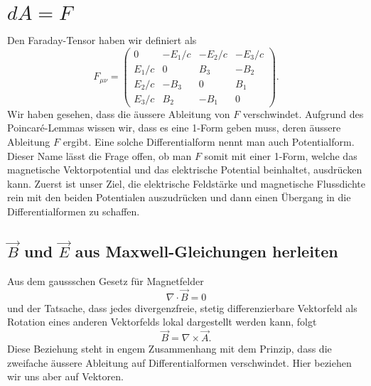 \section{$dA = F$
	\label{maxwell:section:dA}}
Den Faraday-Tensor haben wir definiert als
\begin{equation}
	F_{\mu\nu} = \begin{pmatrix}
		0 & -E_1/c & -E_2/c & -E_3/c \\ E_1/c & 0 & B_3 & -B_2 \\ E_2/c & -B_3 & 0 & B_1 \\ E_3/c & B_2 & -B_1 & 0 
	\end{pmatrix}.
	\label{maxwell:section:dA:Faraday-Tensor}
\end{equation}
Wir haben gesehen, dass die äussere Ableitung von $F$ verschwindet.
Aufgrund des Poincaré-Lemmas wissen wir, dass es eine 1-Form geben muss, deren äussere Ableitung $F$ ergibt.
Eine solche Differentialform nennt man auch Potentialform.
Dieser Name lässt die Frage offen, ob man $F$ somit mit einer 1-Form, welche das magnetische Vektorpotential und das elektrische Potential beinhaltet, ausdrücken kann.
Zuerst ist unser Ziel, die elektrische Feldstärke und magnetische Flussdichte rein mit den beiden Potentialen auszudrücken und dann einen Übergang in die Differentialformen zu schaffen. 

\subsection{$\vec{B}$ und $\vec{E}$ aus Maxwell-Gleichungen herleiten}
Aus dem gaussschen Gesetz für Magnetfelder
\begin{equation*}
	\nabla \cdot \vec{B} = 0
\end{equation*}
und der Tatsache, dass jedes divergenzfreie, stetig differenzierbare Vektorfeld als Rotation eines anderen Vektorfelds lokal dargestellt werden kann,
folgt
\begin{equation}
	\label{maxwell:dA;rotA}
	\vec{B} = \nabla \times \vec{A}.
\end{equation}
Diese Beziehung steht in engem Zusammenhang mit dem Prinzip, dass die zweifache äussere Ableitung auf Differentialformen verschwindet. Hier beziehen wir uns aber auf Vektoren.

